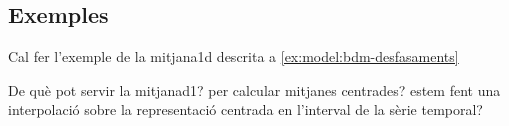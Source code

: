 





\subsection{Exemples}

\todo{}
Cal fer l'exemple de la mitjana1d descrita a \ref{ex:model:bdm-desfasaments}

De què pot servir la mitjanad1? per calcular mitjanes centrades? estem fent una interpolació sobre la representació centrada en l'interval de la sèrie temporal? \todo{}







